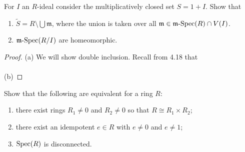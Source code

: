 \begin{problem}
For $I$ an $R$-ideal consider the multiplicatively
closed set $S=1+I$. Show that
\begin{enumerate}[noitemsep,label=(\alph*)]
\item $\widetilde S=R\setminus\bigcup\mathfrak{m}$, where the
  union is taken over all
  $\mathfrak{m}\in\text{${\mathfrak{m}}$-$\operatorname{Spec}$}(R)\cap V(I)$.
\item $\text{${\mathfrak{m}}$-$\operatorname{Spec}$}(R/I)$ are homeomorphic.
\end{enumerate}
\end{problem}
\begin{proof}
(a) We will show double inclusion. Recall from 4.18 that
\\\\
(b)
\end{proof}
\newpage
\begin{problem}
Show that the following are equivalent for a ring $R$:
\begin{enumerate}[noitemsep,label=(\alph*)]
\item there exist rings $R_1\neq 0$ and $R_2\neq 0$ so that
  $R\cong R_1\times R_2$;
\item there exist an idempotent $e\in R$ with $e\neq 0$ and
  $e\neq 1$;
\item $\operatorname{Spec}(R)$ is disconnected.
\end{enumerate}
\end{problem}
